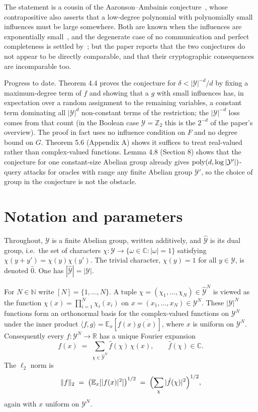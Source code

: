 \documentclass{aicr-conjecture}
\newcommand{\Yc}{\mathcal{Y}}
\newcommand{\Yd}{\hat{\mathcal{Y}}}
\newcommand{\zc}{\hat{0}}
\begin{document}
The statement is a cousin of the Aaronson--Ambainis
conjecture~\cite{AA14}, whose contrapositive also asserts that a
low-degree polynomial with polynomially small influences must be large
somewhere. Both are known when the influences are exponentially
small~\cite{DFKO06}, and the degenerate case of no communication and
perfect completeness is settled by~\cite{OSSS05}; but the paper reports
that the two conjectures do not appear to be directly comparable, and
that their cryptographic consequences are incomparable too.

Progress to date. Theorem 4.4 proves the conjecture for
$\delta < |\Yc|^{-d}/d$ by fixing a maximum-degree term of $f$ and
showing that a $g$ with small influences has, in expectation over a
random assignment to the remaining variables, a constant term dominating
all $|\Yc|^{d}$ non-constant terms of the restriction; the $|\Yc|^{-d}$
loss comes from that count (in the Boolean case $\Yc = \mathbb{Z}_2$
this is the $2^{-d}$ of the paper's overview). The proof in fact uses no
influence condition on $F$ and no degree bound on $G$. Theorem 5.6
(Appendix A) shows it suffices to treat real-valued rather than
complex-valued functions. Lemma 4.8 (Section 8) shows that the
conjecture for one constant-size Abelian group already gives
$\poly(d, \log|\Yc'|)$-query attacks for oracles with range any finite
Abelian group $\Yc'$, so the choice of group in the conjecture is not
the obstacle.

\section{Notation and parameters}\label{sec:notation}

Throughout, $\Yc$ is a finite Abelian group, written additively, and
$\Yd$ is its dual group, i.e.\ the set of characters
$\chi \colon \Yc \to \{\omega \in \mathbb{C} : |\omega| = 1\}$ satisfying
$\chi(y + y') = \chi(y)\chi(y')$. The trivial character, $\chi(y) = 1$
for all $y \in \Yc$, is denoted $\zc$. One has $|\Yd| = |\Yc|$.

For $N \in \mathbb{N}$ write $[N] = \{1, \dots, N\}$. A tuple
$\chi = (\chi_1, \dots, \chi_N) \in \Yd^N$ is viewed as the function
$\chi(x) = \prod_{i=1}^{N} \chi_i(x_i)$ on
$x = (x_1, \dots, x_N) \in \Yc^N$. These $|\Yc|^N$ functions form an
orthonormal basis for the complex-valued functions on $\Yc^N$ under the
inner product
$\langle f, g \rangle = \mathbb{E}_{x}[f(x)\overline{g(x)}]$, where $x$
is uniform on $\Yc^N$. Consequently every $f \colon \Yc^N \to \mathbb{R}$
has a unique Fourier expansion
\[
  f(x) \;=\; \sum_{\chi \in \Yd^N} \hat{f}(\chi)\, \chi(x),
  \qquad \hat{f}(\chi) \in \mathbb{C}.
\]
The $\ell_2$ norm is
\[
  \|f\|_2 \;=\; \bigl(\mathbb{E}_{x}[|f(x)|^2]\bigr)^{1/2}
  \;=\; \Bigl(\sum_{\chi} |\hat{f}(\chi)|^2\Bigr)^{1/2},
\]
again with $x$ uniform on $\Yc^N$.
\end{document}
